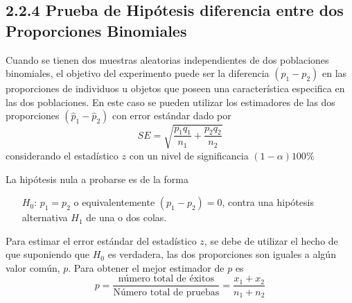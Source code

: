 \begin{frame}
\begin{frame}
\subsection{2.2.4 Prueba de Hip\'otesis diferencia entre dos Proporciones Binomiales}




\begin{Note}
Cuando se tienen dos muestras aleatorias independientes de dos poblaciones binomiales, el objetivo del experimento puede ser la diferencia $\left(p_{1}-p_{2}\right)$ en las proporciones de individuos u objetos que poseen una caracter\'istica especifica en las dos poblaciones. En este caso se pueden utilizar los estimadores de las dos proporciones $\left(\hat{p}_{1}-\hat{p}_{2}\right)$ con error est\'andar dado por
$$SE=\sqrt{\frac{p_{1}q_{1}}{n_{1}}+\frac{p_{2}q_{2}}{n_{2}}}$$
considerando el estad\'istico $z$ con un nivel de significancia $\left(1-\alpha\right)100\%$

\end{Note}


\begin{Note}
La hip\'otesis nula a probarse es de la forma
\begin{itemize}
\item[$H_{0}$: ] $p_{1}=p_{2}$ o equivalentemente $\left(p_{1}-p_{2}\right)=0$, contra una hip\'otesis alternativa $H_{1}$ de una o dos colas.
\end{itemize}
\end{Note}





\begin{Note}
Para estimar el error est\'andar del estad\'istico $z$, se debe de utilizar el hecho de que suponiendo que $H_{0}$ es verdadera, las dos proporciones son iguales a alg\'un valor com\'un, $p$. Para obtener el mejor estimador de $p$ es
$$p=\frac{\textrm{n\'umero total de \'exitos}}{\textrm{N\'umero total de pruebas}}=\frac{x_{1}+x_{2}}{n_{1}+n_{2}}$$
\end{Note}




\end{frame}
\end{frame}
